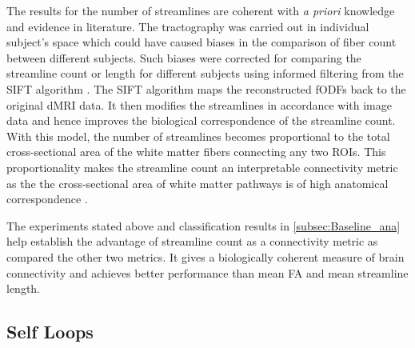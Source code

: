 \documentclass[msthesis.tex]{subfiles}
\begin{document}
The results for the number of streamlines are coherent with \textit{a priori} knowledge and evidence in literature. The tractography was carried out in individual subject's space which could have caused biases in the comparison of fiber count between different subjects. Such biases were corrected for comparing the streamline count or length for different subjects using informed filtering from the \gls{SIFT} algorithm \citep{yeh2020mapping}. The \gls{SIFT} algorithm maps the reconstructed \gls{fODF}s back to the original \gls{dMRI} data. It then modifies the streamlines in accordance with image data and hence improves the biological correspondence of the streamline count. With this model, the number of streamlines becomes proportional to the total cross-sectional area of the white matter fibers connecting any two \gls{ROI}s. This proportionality makes the streamline count an interpretable connectivity metric as the the cross-sectional area of white matter pathways is of high anatomical correspondence \citep{SMITH2015253}. 

The experiments stated above and classification results in \autoref{subsec:Baseline_ana} help establish the advantage of streamline count as a connectivity metric as compared the other two metrics. It gives a biologically coherent measure of brain connectivity and achieves better performance than mean \gls{FA} and mean streamline length. 

\subsection{Self Loops}
\label{res:selfloops}
\end{document}
